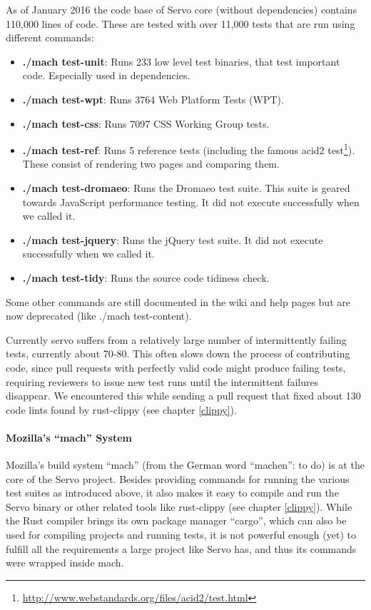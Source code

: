 \documentclass{scrartcl}
\begin{document}
As of January 2016 the code base of Servo core (without dependencies) contains 110,000 lines of code. These are tested with over 11,000 tests that are run using different commands:
\begin{itemize}
    \item \textbf{./mach test-unit}: Runs 233 low level test binaries, that test important code. Especially used in dependencies.
    \item \textbf{./mach test-wpt}: Runs 3764 Web Platform Tests (WPT). 
    \item \textbf{./mach test-css}: Runs 7097 CSS Working Group tests.
    \item \textbf{./mach test-ref}: Runs 5 reference tests (including the famous acid2 test\footnote{\url{http://www.webstandards.org/files/acid2/test.html}}). These consist of rendering two pages and comparing them.
    \item \textbf{./mach test-dromaeo}: Runs the Dromaeo test suite. This suite is geared towards JavaScript performance testing. It did not execute successfully when we called it.
    \item \textbf{./mach test-jquery}: Runs the jQuery test suite. It did not execute successfully when we called it.
    \item \textbf{./mach test-tidy}: Runs the source code tidiness check.
\end{itemize}

Some other commands are still documented in the wiki and help pages but are now deprecated (like ./mach test-content).

Currently servo suffers from a relatively large number of intermittently failing tests, currently about 70-80. This often slows down the process of contributing code, since pull requests with perfectly valid code might produce failing tests, requiring reviewers to issue new test runs until the intermittent failures disappear. We encountered this while sending a pull request that fixed about 130 code lints found by rust-clippy (see chapter \ref{clippy}).


\paragraph{Mozilla's ``mach'' System}
Mozilla's build system ``mach'' (from the German word ``machen'': to do) is at the core of the Servo project. Besides providing commands for running the various test suites as introduced above, it also makes it easy to compile and run the Servo binary or other related tools like rust-clippy (see chapter \ref{clippy}). While the Rust compiler brings its own package manager ``cargo'', which can also be used for compiling projects and running tests, it is not powerful enough (yet) to fulfill all the requirements a large project like Servo has, and thus its commands were wrapped inside mach.
\end{document}
